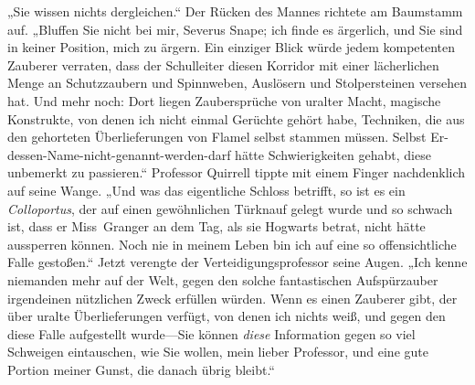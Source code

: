 „Sie wissen nichts dergleichen.“ Der Rücken des Mannes richtete am Baumstamm auf. „Bluffen Sie nicht bei mir, Severus Snape; ich finde es ärgerlich, und Sie sind in keiner Position, mich zu ärgern. Ein einziger Blick würde jedem kompetenten Zauberer verraten, dass der Schulleiter diesen Korridor mit einer lächerlichen Menge an Schutzzaubern und Spinnweben, Auslösern und Stolpersteinen versehen hat. Und mehr noch: Dort liegen Zaubersprüche von uralter Macht, magische Konstrukte, von denen ich nicht einmal Gerüchte gehört habe, Techniken, die aus den gehorteten Überlieferungen von Flamel selbst stammen müssen. Selbst Er-dessen-Name-nicht-genannt-werden-darf hätte Schwierigkeiten gehabt, diese unbemerkt zu passieren.“ Professor Quirrell tippte mit einem Finger nachdenklich auf seine Wange. „Und was das eigentliche Schloss betrifft, so ist es ein \emph{Colloportus}, der auf einen gewöhnlichen Türknauf gelegt wurde und so schwach ist, dass er Miss~Granger an dem Tag, als sie Hogwarts betrat, nicht hätte aussperren können. Noch nie in meinem Leben bin ich auf eine so offensichtliche Falle gestoßen.“ Jetzt verengte der Verteidigungsprofessor seine Augen. „Ich kenne niemanden mehr auf der Welt, gegen den solche fantastischen Aufspürzauber irgendeinen nützlichen Zweck erfüllen würden. Wenn es einen Zauberer gibt, der über uralte Überlieferungen verfügt, von denen ich nichts weiß, und gegen den diese Falle aufgestellt wurde—Sie können \emph{diese} Information gegen so viel Schweigen eintauschen, wie Sie wollen, mein lieber Professor, und eine gute Portion meiner Gunst, die danach übrig bleibt.“

